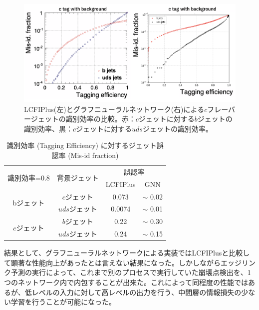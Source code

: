 \begin{figure}[H]
	\begin{center}
 \includegraphics[keepaspectratio, scale=0.33]
 	{Figure/Flavortagging/gnneff_c.png}
 		\caption{LCFIPlus(左)とグラフニューラルネットワーク(右)による$c$フレーバージェットの識別効率の比較。赤：$c$ジェットに対する$b$ジェットの識別効率、黒：$c$ジェットに対する$uds$ジェットの識別効率。}
 		\label{gnneff_c}
	\end{center}
\end{figure}

\begin{table}[H]
 \centering
  \begin{tabular}{ |c|c|c|c|}
   \hline
   \multirow{2}{*}{識別効率=0.8} & \multirow{2}{*}{背景ジェット} & \multicolumn{2}{c|}{誤認率} \\ \cline{3-4} 
    & & LCFIPlus & GNN\\ \cline{3-4} 
    \hline \hline
   \multirow{2}{*}{bジェット} & $c$ジェット & 0.073 & $\sim$ 0.02\\ \cline{2-2} 
   & $uds$ジェット & 0.0074 & $\sim$ 0.01 \\ \cline{1-2} 
   \multirow{2}{*}{$c$ジェット} & $b$ジェット & 0.22 & $\sim$ 0.30\\ \cline{2-2} 
   & $uds$ジェット & 0.24 & $\sim$ 0.15\\
   \hline
  \end{tabular}
  \caption{識別効率 (Tagging Efficiency) に対するジェット誤認率 (Mis-id fraction)}
  \label{gnn_lcfi}
\end{table}
結果として、グラフニューラルネットワークによる実装ではLCFIPlusと比較して顕著な性能向上があったとは言えない結果になった。しかしながらエッジリンク予測の実行によって、これまで別のプロセスで実行していた崩壊点検出を、1つのネットワーク内で内包することが出来た。これによって同程度の性能ではあるが、低レベルの入力に対して高レベルの出力を行う、中間層の情報損失の少ない学習を行うことが可能になった。